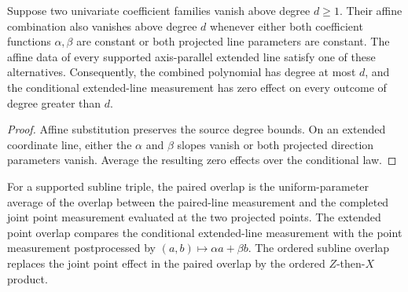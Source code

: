 \begin{lemma}
	\label{lem:qld-combined-polynomial-axis-degree}
	\leanok
	Suppose two univariate coefficient families vanish above degree $d\geq1$.
	Their affine combination also vanishes above degree $d$ whenever either
	both coefficient functions $\alpha,\beta$ are constant or both projected
	line parameters are constant. The affine data of every supported
	axis-parallel extended line satisfy one of these alternatives. Consequently,
	the combined polynomial has degree at most $d$, and the conditional
	extended-line measurement has zero effect on every outcome of degree greater
	than $d$.
\end{lemma}
\begin{proof}
	\leanok
	Affine substitution preserves the source degree bounds. On an extended
	coordinate line, either the $\alpha$ and $\beta$ slopes vanish or both
	projected direction parameters vanish. Average the resulting zero effects
	over the conditional law.
\end{proof}

\begin{definition}
	\label{def:qld-subline-overlaps}
	\leanok
	For a supported subline triple, the paired overlap is the uniform-parameter
	average of the overlap between the paired-line measurement and the completed
	joint point measurement evaluated at the two projected points. The extended
	point overlap compares the conditional extended-line measurement with the
	point measurement postprocessed by $(a,b)\mapsto\alpha a+\beta b$. The
	ordered subline overlap replaces the joint point effect in the paired overlap
	by the ordered $Z$-then-$X$ product.
\end{definition}

